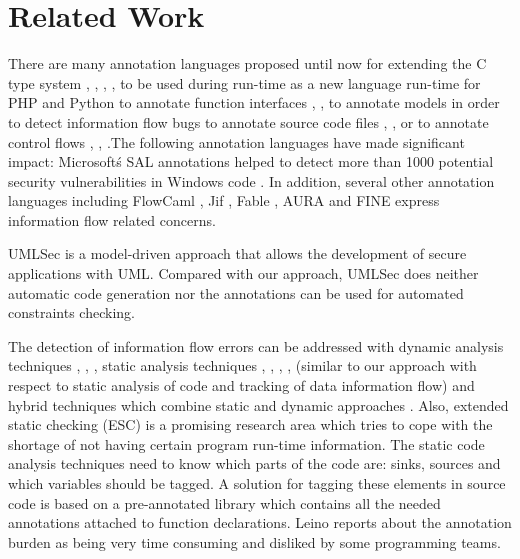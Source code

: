 \chapter{Related Work}

There are many annotation languages proposed until now for
extending the C type system \cite{ref_54_condit:dependent}, \cite{ref_53_evans:static}, \cite{ref_51_microsoft:sal}, \cite{ref_55_sun:lock}, \cite{ref_56_torvalds:sparse} to be
used during run-time as a new language run-time for PHP and
Python \cite{ref_57_alex:improving} to annotate function interfaces \cite{ref_53_evans:static}, \cite{ref_51_microsoft:sal}, \cite{ref_56_torvalds:sparse} to
annotate models in order to detect information flow bugs \cite{ref_58_iflow:kuzman}
to annotate source code files \cite{ref_59_rosenblum:towards}, \cite{ref_60_rosenblum:practical}, \cite{ref_61_lintan:acomment} or to annotate
control flows \cite{ref_53_evans:static}, \cite{ref_52_splint:flow}, \cite{ref_51_microsoft:sal}.The following annotation languages have made significant impact: Microsoft\'s SAL annotations \cite{ref_51_microsoft:sal} helped to detect more than 1000 potential security vulnerabilities in Windows
code \cite{ref_50_ball:research}. In addition, several other annotation languages including FlowCaml \cite{ref_49_simonet:flowcaml}, Jif \cite{ref_48_chong:jif}, Fable \cite{ref_47_swamy:fable}, AURA \cite{ref_46_jia:aura} and FINE \cite{ref_45_nikhil:fine} express information flow related concerns.

UMLSec \cite{ref_33_juerjens:secure} is a model-driven approach that allows the
development of secure applications with UML. Compared with
our approach, UMLSec does neither automatic code
generation nor the annotations can be used for automated
constraints checking.

The detection of information flow errors can be
addressed with dynamic analysis techniques \cite{ref_44_avgerinos:aeg}, \cite{ref_43_fenton:memoryless}, \cite{ref_42_myers:jflow},
static analysis techniques \cite{ref_41_myers:jflow}, \cite{ref_40_myers:jflow}, \cite{ref_39_simonet:report}, \cite{ref_38_volpano:sound}, \cite{ref_37_xiao:transparent} (similar
to our approach with respect to static analysis of code and
tracking of data information flow) and hybrid techniques which
combine static and dynamic approaches \cite{ref_36_moore:static}. Also, extended
static checking \cite{ref_35_david:extended} (ESC) is a promising research area which
tries to cope with the shortage of not having certain program
run-time information.
The static code analysis techniques need to know which
parts of the code are: sinks, sources and which variables
should be tagged. A solution for tagging these elements in
source code is based on a pre-annotated library which contains
all the needed annotations attached to function declarations.
Leino \cite{ref_34_leino:10years} reports about the annotation burden as being very
time consuming and disliked by some programming teams.

